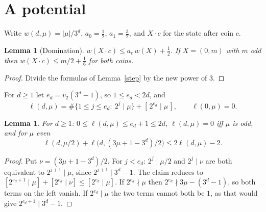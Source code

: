 \documentclass[11pt]{article}
\newtheorem{lemma}[theorem]{Lemma}
\theoremstyle{remark}
\begin{document}
\section{A potential}
Write $w(d,\mu)=|\mu|/3^d$, $a_0=\tfrac12$, $a_1=\tfrac32$, and $X\cdot c$ for the state after coin
$c$.
\begin{lemma}[Domination]\label{dom}
$w(X\cdot c)\le a_c\,w(X)+\tfrac12$. If $X=(0,m)$ with $m$ odd then $w(X\cdot c)\le m/2+\tfrac16$
for both coins.
\end{lemma}
\begin{proof} Divide the formulas of Lemma~\ref{step} by the new power of $3$. \end{proof}

For $d\ge1$ let $e_d=v_2(3^d-1)$, so $1\le e_d<2d$, and
\[
\ell(d,\mu)=\#\{1\le j\le e_d:\ 2^j\mid\mu\}+[\,2^{e_d}\mid\mu\,],\qquad \ell(0,\mu)=0.
\]
\begin{lemma}\label{ell}
For $d\ge1$: $0\le\ell(d,\mu)\le e_d+1\le2d$, $\ell(d,\mu)=0$ iff $\mu$ is odd, and for $\mu$ even
\[
\ell(d,\mu/2)+\ell\bigl(d,(3\mu+1-3^d)/2\bigr)\le 2\ell(d,\mu)-2 .
\]
\end{lemma}
\begin{proof}
Put $\nu=(3\mu+1-3^d)/2$. For $j<e_d$: $2^j\mid\mu/2$ and $2^j\mid\nu$ are both equivalent to
$2^{j+1}\mid\mu$, since $2^{j+1}\mid 3^d-1$. The claim reduces to
$[2^{e_d+1}\mid\mu]+[2^{e_d}\mid\nu]\le[2^{e_d}\mid\mu]$. If $2^{e_d}\nmid\mu$ then
$2^{e_d}\nmid 3\mu-(3^d-1)$, so both terms on the left vanish. If $2^{e_d}\mid\mu$ the two terms
cannot both be $1$, as that would give $2^{e_d+1}\mid 3^d-1$.
\end{proof}
\end{document}
